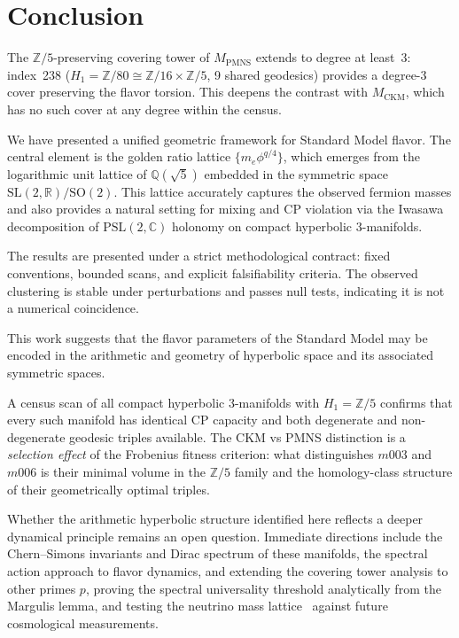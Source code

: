﻿\documentclass[12pt]{article}
\theoremstyle{definition}
\begin{document}
\section{Conclusion}
\label{sec:conclusion}

The $\mathbb{Z}/5$-preserving covering tower of $M_\text{PMNS}$ extends to degree at least~3: index~238 ($H_1=\mathbb{Z}/80\cong\mathbb{Z}/16\times\mathbb{Z}/5$, 9 shared geodesics) provides a degree-3 cover preserving the flavor torsion. This deepens the contrast with $M_\text{CKM}$, which has no such cover at any degree within the census.

We have presented a unified geometric framework for Standard Model flavor. The central element is the golden ratio lattice $\{m_e \phi^{q/4}\}$, which emerges from the logarithmic unit lattice of $\mathbb{Q}(\sqrt5)$ embedded in the symmetric space $\mathrm{SL}(2,\mathbb{R})/\mathrm{SO}(2)$. This lattice accurately captures the observed fermion masses and also provides a natural setting for mixing and CP violation via the Iwasawa decomposition of $\mathrm{PSL}(2,\mathbb{C})$ holonomy on compact hyperbolic 3-manifolds.

The results are presented under a strict methodological contract: fixed conventions, bounded scans, and explicit falsifiability criteria. The observed clustering is stable under perturbations and passes null tests, indicating it is not a numerical coincidence.

This work suggests that the flavor parameters of the Standard Model may be encoded in the arithmetic and geometry of hyperbolic space and its associated symmetric spaces.

A census scan of all compact hyperbolic 3-manifolds with $H_1=\mathbb{Z}/5$ confirms that every such manifold has identical CP capacity and both degenerate and non-degenerate geodesic triples available. The CKM vs PMNS distinction is a \emph{selection effect} of the Frobenius fitness criterion: what distinguishes $m003$ and $m006$ is their minimal volume in the $\mathbb{Z}/5$ family and the homology-class structure of their geometrically optimal triples.

Whether the arithmetic hyperbolic structure identified here reflects a deeper dynamical principle remains an open question. Immediate directions include the Chern--Simons invariants and Dirac spectrum of these manifolds, the spectral action approach to flavor dynamics, and extending the covering tower analysis to other primes $p$,
proving the spectral universality threshold analytically from
the Margulis lemma, and testing the neutrino mass lattice~\cite{Gentry:neutrino} against future cosmological measurements.
\end{document}
